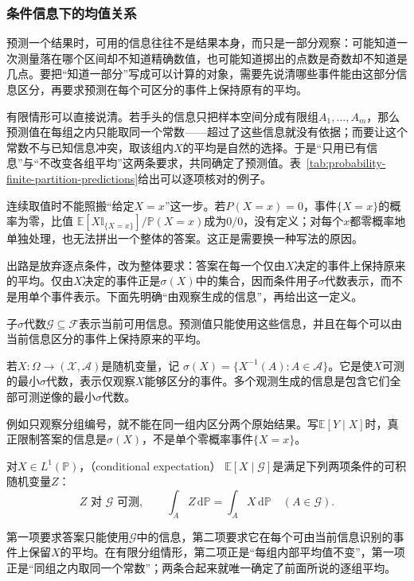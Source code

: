 \subsubsection{条件信息下的均值关系}
\label{sec:rv-conditional-expectation}
预测一个结果时，可用的信息往往不是结果本身，而只是一部分观察：可能知道一次测量落在哪个区间却不知道精确数值，也可能知道掷出的点数是奇数却不知道是几点。要把“知道一部分”写成可以计算的对象，需要先说清哪些事件能由这部分信息区分，再要求预测在每个可区分的事件上保持原有的平均。

有限情形可以直接说清。若手头的信息只把样本空间分成有限组\(A_1,\ldots,A_m\)，那么预测值在每组之内只能取同一个常数——超过了这些信息就没有依据；而要让这个常数不与已知信息冲突，取该组内\(X\)的平均是自然的选择。于是“只用已有信息”与“不改变各组平均”这两条要求，共同确定了预测值。表~\ref{tab:probability-finite-partition-predictions}给出可以逐项核对的例子。

连续取值时不能照搬“给定\(X=x\)”这一步。若\(P(X=x)=0\)，事件\(\{X=x\}\)的概率为零，比值
\(\mathbb E[X\mathbb I_{\{X=x\}}]/\mathbb P(X=x)\)成为\(0/0\)，没有定义；对每个\(x\)都零概率地单独处理，也无法拼出一个整体的答案。这正是需要换一种写法的原因。

出路是放弃逐点条件，改为整体要求：答案在每一个仅由\(X\)决定的事件上保持原来的平均。仅由\(X\)决定的事件正是\(\sigma(X)\)中的集合，因而条件用子\(\sigma\)代数表示，而不是用单个事件表示。下面先明确“由观察生成的信息”，再给出这一定义。

子\(\sigma\)代数\(\mathcal{G}\subseteq\mathcal{F}\)表示当前可用信息。预测值只能使用这些信息，并且在每个可以由当前信息区分的事件上保持原来的平均。
\begin{definition}[观测生成的信息]
  \label{def:probability-generated-information}
若\(X:\Omega\to(\mathcal X,\mathcal A)\)是随机变量，记
\(\sigma(X)=\{X^{-1}(A):A\in\mathcal A\}\)。它是使\(X\)可测的最小\(\sigma\)代数，表示仅观察\(X\)能够区分的事件。多个观测生成的信息是包含它们全部可测逆像的最小\(\sigma\)代数。
\end{definition}
例如只观察分组编号，就不能在同一组内区分两个原始结果。写\(\mathbb E[Y\mid X]\)时，真正限制答案的信息是\(\sigma(X)\)，不是单个零概率事件\(\{X=x\}\)。
\begin{definition}[条件期望]
  \label{def:probability-conditional-expectation}
对\(X\in L^1(\mathbb P)\)，（conditional expectation）
\(\mathbb{E}[X\mid\mathcal{G}]\)是满足下列两项条件的可积随机变量\(Z\)：
\[ Z\text{ 对 }\mathcal{G}\text{ 可测},
  \qquad\int_A Z\,\mathrm{d}\mathbb{P}=\int_A X\,\mathrm{d}\mathbb{P}\quad(A\in\mathcal{G}). \]
\end{definition}
第一项要求答案只能使用\(\mathcal{G}\)中的信息，第二项要求它在每个可由当前信息识别的事件上保留\(X\)的平均。在有限分组情形，第二项正是“每组内部平均值不变”，第一项正是“同组之内取同一个常数”；两条合起来就唯一确定了前面所说的逐组平均。

